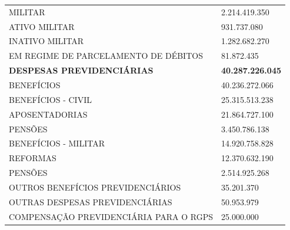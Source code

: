 \documentclass{article}
\begin{document}
\begin{longtable}[c]{m{12cm}m{3cm}}
\multicolumn{1}{L{12cm}}{\hspace{6em} MILITAR} & \multicolumn{1}{R{3cm}}{2.214.419.350} \\
\multicolumn{1}{L{12cm}}{\hspace{8em} ATIVO MILITAR} & \multicolumn{1}{R{3cm}}{931.737.080} \\
\multicolumn{1}{L{12cm}}{\hspace{8em} INATIVO MILITAR} & \multicolumn{1}{R{3cm}}{1.282.682.270} \\
\multicolumn{1}{L{12cm}}{\hspace{6em} EM REGIME DE PARCELAMENTO DE DÉBITOS} & \multicolumn{1}{R{3cm}}{81.872.435} \\
\hline\hline
\multicolumn{1}{L{12cm}}{\hspace{0em} \textbf{ DESPESAS PREVIDENCIÁRIAS }} & \multicolumn{1}{R{3cm}}{\textbf{ 40.287.226.045 }} \\
\multicolumn{1}{L{12cm}}{\hspace{2em} BENEFÍCIOS} & \multicolumn{1}{R{3cm}}{40.236.272.066} \\
\multicolumn{1}{L{12cm}}{\hspace{4em} BENEFÍCIOS -  CIVIL} & \multicolumn{1}{R{3cm}}{25.315.513.238} \\
\multicolumn{1}{L{12cm}}{\hspace{6em} APOSENTADORIAS} & \multicolumn{1}{R{3cm}}{21.864.727.100} \\
\multicolumn{1}{L{12cm}}{\hspace{6em} PENSÕES} & \multicolumn{1}{R{3cm}}{3.450.786.138} \\
\multicolumn{1}{L{12cm}}{\hspace{4em} BENEFÍCIOS - MILITAR} & \multicolumn{1}{R{3cm}}{14.920.758.828} \\
\multicolumn{1}{L{12cm}}{\hspace{6em} REFORMAS} & \multicolumn{1}{R{3cm}}{12.370.632.190} \\
\multicolumn{1}{L{12cm}}{\hspace{6em} PENSÕES} & \multicolumn{1}{R{3cm}}{2.514.925.268} \\
\multicolumn{1}{L{12cm}}{\hspace{6em} OUTROS BENEFÍCIOS PREVIDENCIÁRIOS} & \multicolumn{1}{R{3cm}}{35.201.370} \\
\multicolumn{1}{L{12cm}}{\hspace{2em} OUTRAS DESPESAS PREVIDENCIÁRIAS} & \multicolumn{1}{R{3cm}}{50.953.979} \\
\multicolumn{1}{L{12cm}}{\hspace{4em} COMPENSAÇÃO PREVIDENCIÁRIA PARA O RGPS} & \multicolumn{1}{R{3cm}}{25.000.000} \\

\end{longtable}
\end{document}
